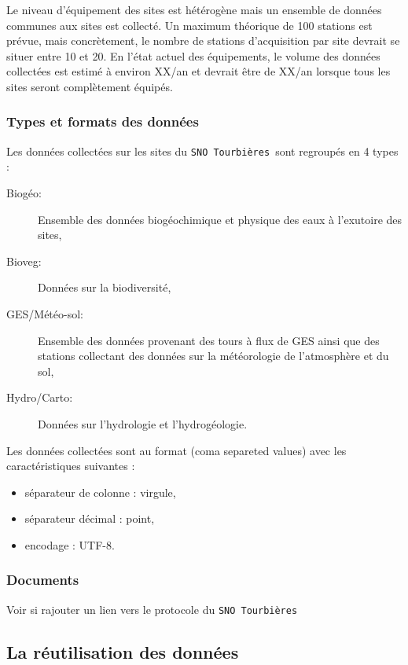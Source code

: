 \documentclass[]{article}
\newcommand{\SNOT}{{\tt SNO~Tourbières }}
\begin{document}
Le niveau d'équipement des sites est hétérogène mais un ensemble de données communes aux sites est collecté. Un maximum théorique de 100 stations est prévue, mais concrètement, le nombre de stations d'acquisition par site devrait se situer entre 10 et 20. En l'état actuel des équipements, le volume des données collectées est estimé à environ XX/an et devrait être de XX/an lorsque tous les sites seront complètement équipés.
	
\subsubsection{Types et formats des données}
Les données collectées sur les sites du \SNOT sont regroupés en 4 types :
	
\begin{description}
	\item[Biogéo:]Ensemble des données biogéochimique et physique des eaux à l'exutoire des sites,
	\item[Bioveg:]Données sur la biodiversité,
	\item[GES/Météo-sol:]Ensemble des données provenant des tours à flux de GES ainsi que des stations collectant des données sur la météorologie de l'atmosphère et du sol,
	\item[Hydro/Carto:]Données sur l'hydrologie et l'hydrogéologie.
\end{description}
	
Les données collectées sont au format  (coma separeted values) avec les caractéristiques suivantes : 
	
\begin{itemize}
	\item séparateur de colonne : virgule,
	\item séparateur décimal : point,
	\item encodage : UTF-8.
\end{itemize}
	
\subsubsection{Documents}
	
Voir si rajouter un lien vers le protocole du \SNOT
	
\subsection{La réutilisation des données}
	
\end{document}
